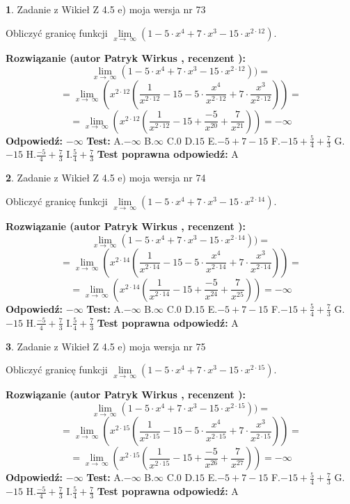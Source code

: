 \documentclass[12pt, a4paper]{article}
\theoremstyle{definition} %
\newtheorem{zad}{}
\newcommand{\zadStart}[1]{\begin{zad}#1\newline}
\newcommand{\zadStop}{\end{zad}}
\newcommand{\rozwStart}[2]{\noindent \textbf{Rozwiązanie (autor #1 , recenzent #2): }\newline}
\newcommand{\rozwStop}{\newline}
\newcommand{\odpStart}{\noindent \textbf{Odpowiedź:}\newline}
\newcommand{\odpStop}{\newline}
\newcommand{\testStart}{\noindent \textbf{Test:}\newline}
\newcommand{\testStop}{\newline}
\newcommand{\kluczStart}{\noindent \textbf{Test poprawna odpowiedź:}\newline}
\newcommand{\kluczStop}{\newline}
\begin{document}
\zadStart{Zadanie z Wikieł Z 4.5 e) moja wersja nr 73}



Obliczyć granicę funkcji  $\lim\limits_{x\to\ \infty}(1 - 5 \cdot x^{4}+7 \cdot x^{3}- 15 \cdot x^{2\cdot12})$.
\zadStop
\rozwStart{Patryk Wirkus}{}
$$\lim\limits_{x\to\ \infty}(1 - 5 \cdot x^{4}+7 \cdot x^{3}- 15 \cdot x^{2\cdot12}))=$$
$$=\lim\limits_{x\to\ \infty}(x^{2\cdot12}(\frac{1}{x^{2\cdot12}}-15 -5 \cdot \frac{x^{4}}{x^{2\cdot12}}+7 \cdot \frac{x^{3}}{x^{2\cdot12}}))=$$
$$=\lim\limits_{x\to\ \infty}(x^{2\cdot12}(\frac{1}{x^{2\cdot12}}-15 + \frac{-5}{x^{20}}+ \frac{7}{x^{21}}))=-\infty$$
\rozwStop
\odpStart
$-\infty$
\odpStop
\testStart
A.$-\infty$ B.$\infty$ C.$0$ D.$15$ E.$-5 + 7 - 15$
F.$-15+\frac{5}{4}+\frac{7}{3}$ G.$-15$
H.$\frac{-5}{4}+\frac{7}{3}$
I.$\frac{5}{4}+\frac{7}{3}$
\testStop
\kluczStart
A
\kluczStop



\zadStart{Zadanie z Wikieł Z 4.5 e) moja wersja nr 74}



Obliczyć granicę funkcji  $\lim\limits_{x\to\ \infty}(1 - 5 \cdot x^{4}+7 \cdot x^{3}- 15 \cdot x^{2\cdot14})$.
\zadStop
\rozwStart{Patryk Wirkus}{}
$$\lim\limits_{x\to\ \infty}(1 - 5 \cdot x^{4}+7 \cdot x^{3}- 15 \cdot x^{2\cdot14}))=$$
$$=\lim\limits_{x\to\ \infty}(x^{2\cdot14}(\frac{1}{x^{2\cdot14}}-15 -5 \cdot \frac{x^{4}}{x^{2\cdot14}}+7 \cdot \frac{x^{3}}{x^{2\cdot14}}))=$$
$$=\lim\limits_{x\to\ \infty}(x^{2\cdot14}(\frac{1}{x^{2\cdot14}}-15 + \frac{-5}{x^{24}}+ \frac{7}{x^{25}}))=-\infty$$
\rozwStop
\odpStart
$-\infty$
\odpStop
\testStart
A.$-\infty$ B.$\infty$ C.$0$ D.$15$ E.$-5 + 7 - 15$
F.$-15+\frac{5}{4}+\frac{7}{3}$ G.$-15$
H.$\frac{-5}{4}+\frac{7}{3}$
I.$\frac{5}{4}+\frac{7}{3}$
\testStop
\kluczStart
A
\kluczStop



\zadStart{Zadanie z Wikieł Z 4.5 e) moja wersja nr 75}



Obliczyć granicę funkcji  $\lim\limits_{x\to\ \infty}(1 - 5 \cdot x^{4}+7 \cdot x^{3}- 15 \cdot x^{2\cdot15})$.
\zadStop
\rozwStart{Patryk Wirkus}{}
$$\lim\limits_{x\to\ \infty}(1 - 5 \cdot x^{4}+7 \cdot x^{3}- 15 \cdot x^{2\cdot15}))=$$
$$=\lim\limits_{x\to\ \infty}(x^{2\cdot15}(\frac{1}{x^{2\cdot15}}-15 -5 \cdot \frac{x^{4}}{x^{2\cdot15}}+7 \cdot \frac{x^{3}}{x^{2\cdot15}}))=$$
$$=\lim\limits_{x\to\ \infty}(x^{2\cdot15}(\frac{1}{x^{2\cdot15}}-15 + \frac{-5}{x^{26}}+ \frac{7}{x^{27}}))=-\infty$$
\rozwStop
\odpStart
$-\infty$
\odpStop
\testStart
A.$-\infty$ B.$\infty$ C.$0$ D.$15$ E.$-5 + 7 - 15$
F.$-15+\frac{5}{4}+\frac{7}{3}$ G.$-15$
H.$\frac{-5}{4}+\frac{7}{3}$
I.$\frac{5}{4}+\frac{7}{3}$
\testStop
\kluczStart
A
\kluczStop
\end{document}
